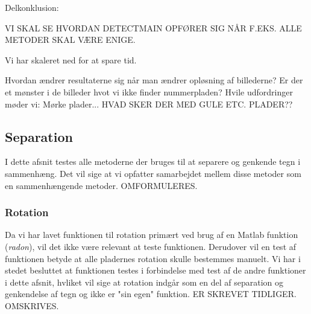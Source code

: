 \begin{comment} %
\subsubsection*{Observeret sæt på 407 billeder}
Scale: 0.25
DetectMain: 96.6/99.24
DetectQuant: 67.8/75.4
DetectSameness: 56.8/95.5
DetectContrastAvg: 62.7/85.0
DetectPlateness: 50.4/65.5
DetectCStretch: 84.0/92.7

Scale: 0.50 (Ekstremt langsomt)
DetectPlateness: 29.7/56.5
DetectCStretch:
\end{comment}


Delkonklusion:

VI SKAL SE HVORDAN DETECTMAIN OPFØRER SIG NÅR F.EKS. ALLE METODER SKAL VÆRE ENIGE.

Vi har skaleret ned for at spare tid.

Hvordan ændrer resultaterne sig når man ændrer opløsning af billederne?
Er der et mønster i de billeder hvot vi ikke finder nummerpladen? Hvile udfordringer møder vi: Mørke plader... 
HVAD SKER DER MED GULE ETC. PLADER??



\subsection{Separation}


I dette afsnit testes alle metoderne der bruges til at separere og genkende tegn i sammenhæng. Det vil sige at vi opfatter samarbejdet mellem disse metoder som en sammenhængende metoder. OMFORMULERES.

\subsubsection{Rotation}

Da vi har lavet funktionen til rotation primært ved brug af en Matlab funktion (\textit{radon}), vil det ikke være relevant at teste funktionen. Derudover vil en test af funktionen betyde at alle pladernes rotation skulle bestemmes manuelt. Vi har i stedet besluttet at funktionen testes i forbindelse med test af de andre funktioner i dette afsnit, hvliket vil sige at rotation indgår som en del af separation og genkendelse af tegn og ikke er "sin egen" funktion. ER SKREVET TIDLIGER. OMSKRIVES.

